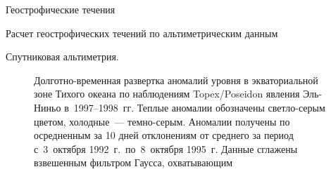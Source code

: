 \begin{chapter}{Геострофические течения}
\begin{section}{Расчет геострофических течений по альтиметрическим данным}
\begin{paragraph}{Спутниковая альтиметрия.}
\begin{figure}[t!]
\caption{Долготно-временная развертка аномалий 
уровня в экваториальной зоне Тихого океана по наблюдениям Topex/Poseidon 
явления Эль-Ниньо в~1997--1998~гг.%
Теплые аномалии обозначены 
светло-серым цветом, холодные~--- темно-серым. 
Аномалии получены по осредненным за 10 дней отклонениям от
среднего за период с~3~октября 1992~г.\ по~8~октября 1995~г. 
Данные сглажены взвешенным фильтром Гаусса, охватывающим
}
\end{figure}
\end{paragraph}
\end{section}
\end{chapter}
